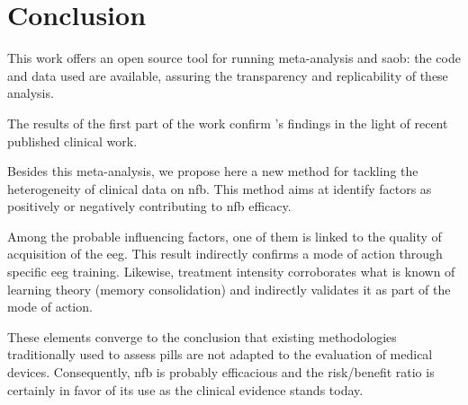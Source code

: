

\section{Conclusion}

This work offers an open source tool for running meta-analysis and \gls{saob}: the code and data used are available, 
assuring the transparency and replicability of these analysis. 

The results of the first part of the work confirm \citet{Cortese2016}'s findings in the light of recent published clinical work.

Besides this meta-analysis, we propose here a new method for tackling the heterogeneity of clinical data on \gls{nfb}. This method aims at identify factors 
as positively or negatively contributing to \gls{nfb} efficacy. 

Among the probable influencing factors, one of them is linked to the quality
of acquisition of the \gls{eeg}. This result indirectly confirms a mode of action through specific \gls{eeg} training.
Likewise, treatment intensity corroborates what is known of learning theory (memory consolidation) and indirectly validates it as
part of the mode of action.

These elements converge to the conclusion that existing methodologies traditionally used to assess pills are not adapted to the evaluation 
of medical devices. Consequently, \gls{nfb} is probably efficacious and the risk/benefit ratio is certainly in favor of its use as the
clinical evidence stands today.
